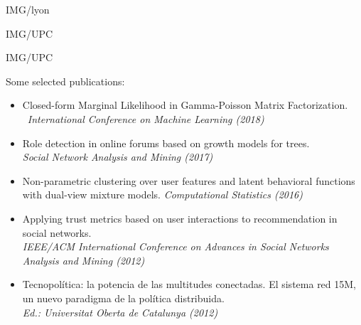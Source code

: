 \documentclass[paper=a4,fontsize=11pt]{temp} %
\begin{document}
\sepspace

\noindent

 {IMG/lyon}

\sepspace
{} {IMG/UPC}

\sepspace
{} {IMG/UPC}



\noindent{}

\noindent{}

\noindent{}

\noindent{}

\noindent{}


Some selected publications:
\begin{itemize}[leftmargin=*]
\item Closed-form Marginal Likelihood in Gamma-Poisson Matrix Factorization. \\\ \textit{International Conference on Machine Learning (2018)}
\item Role detection in online forums based on growth models for trees. \\\textit{Social Network Analysis and Mining (2017)}
\item Non-parametric clustering over user features and latent behavioral functions with dual-view mixture models. \textit{Computational Statistics (2016)}
\item Applying trust metrics based on user interactions to recommendation in social networks. \\\textit{IEEE/ACM International Conference on Advances in Social Networks Analysis and Mining (2012)} 
\item Tecnopolítica: la potencia de las multitudes conectadas. El sistema red 15M, un nuevo paradigma de la política distribuida. \\\textit{Ed.: Universitat Oberta de Catalunya (2012)}
\end{itemize}
\end{document}
